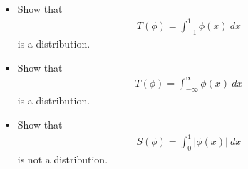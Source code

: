 \documentclass[11pt]{article}
\begin{document}
\begin{exercise}
    \begin{itemize}    
        \item 
        Show that 
        \begin{align}\label{eq:ex2 dist1}
            T(\phi) = \int_{-1}^{1} \phi(x) \ dx
        \end{align}
        is a distribution. 
        \item 
        Show that 
        \begin{align}\label{eq:ex2 dist2}
            T(\phi) = \int_{-\infty}^{\infty} \phi(x) \ dx
        \end{align}
        is a distribution. 
        \item 
        Show that 
        \begin{align}\label{eq:ex2 dist3}
            S(\phi) = \int_{0}^{1} |\phi(x)| \ dx 
        \end{align}
        is not a distribution.
    \end{itemize}
\end{exercise}
\end{document}
